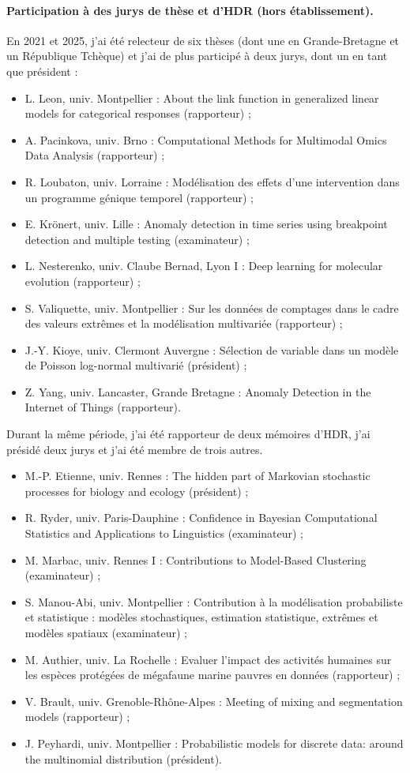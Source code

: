\paragraph{Participation à des jurys de thèse et d’HDR (hors établissement). }
En 2021 et 2025, j'ai été relecteur de six thèses (dont une en Grande-Bretagne et un République Tchèque) et j'ai de plus participé à deux jurys, dont un en tant que président : 
\begin{itemize}
  \item L. Leon, univ. Montpellier : About the link function in generalized linear models for categorical responses (rapporteur) ; 
  \item A. Pacinkova, univ. Brno : Computational Methods for Multimodal Omics Data Analysis (rapporteur) ; 
  \item R. Loubaton, univ. Lorraine : Modélisation des effets d’une intervention dans un programme génique temporel (rapporteur) ; 
  \item E. Krönert, univ. Lille : Anomaly detection in time series using breakpoint detection and multiple testing (examinateur) ; 
  \item L. Nesterenko, univ. Claube Bernad, Lyon I : Deep learning for molecular evolution (rapporteur) ; 
  \item S. Valiquette, univ. Montpellier : Sur les données de comptages dans le cadre des valeurs extrêmes et la modélisation multivariée (rapporteur) ; 
  \item J.-Y. Kioye, univ. Clermont Auvergne : Sélection de variable dans un modèle de Poisson log-normal multivarié (président) ; 
  \item Z. Yang, univ. Lancaster, Grande Bretagne : Anomaly Detection in the Internet of Things (rapporteur).
\end{itemize}
Durant la même période, j'ai été rapporteur de deux mémoires d'HDR, j'ai présidé deux jurys  et j'ai été membre de trois autres. 
\begin{itemize}
  \item M.-P. Etienne, univ. Rennes : The hidden part of Markovian stochastic processes
  for biology and ecology (président) ; 
  \item R. Ryder, univ. Paris-Dauphine : Confidence in Bayesian Computational Statistics 
  and Applications to Linguistics (examinateur) ; 
  \item M. Marbac, univ. Rennes I : Contributions to Model-Based Clustering (examinateur) ;
  \item S. Manou-Abi, univ. Montpellier : Contribution à la modélisation probabiliste et statistique : modèles stochastiques, estimation statistique, extrêmes et modèles spatiaux (examinateur) ; 
  \item M. Authier, univ. La Rochelle : Evaluer l’impact des activités humaines sur les espèces protégées de mégafaune marine pauvres en données (rapporteur) ; 
  \item V. Brault, univ. Grenoble-Rhône-Alpes : Meeting of mixing and segmentation models (rapporteur) ; 
  \item J. Peyhardi, univ. Montpellier : Probabilistic models for discrete data:
around the multinomial distribution (président).
\end{itemize}
